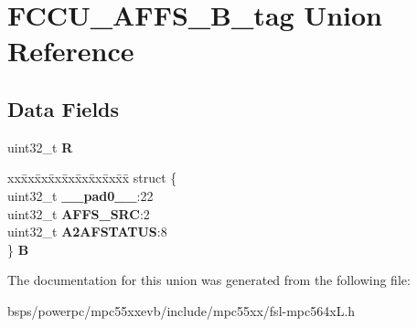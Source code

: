 \hypertarget{unionFCCU__AFFS__32B__tag}{}\section{F\+C\+C\+U\+\_\+\+A\+F\+F\+S\+\_\+B\+\_\+tag Union Reference}
\label{unionFCCU__AFFS__32B__tag}
\subsection*{Data Fields}
\begin{DoxyCompactItemize}
\item 
\mbox{\label{unionFCCU__AFFS__32B__tag_ac6870abcb7cd6692750a5fca0755a75c}} 
uint32\+\_\+t {\bfseries R}
\item 
\mbox{\label{unionFCCU__AFFS__32B__tag_af6837127660af7320d7a0312c13b4f09}} 
\begin{tabbing}
xx\=xx\=xx\=xx\=xx\=xx\=xx\=xx\=xx\=\kill
struct \{\\
\>uint32\_t {\bfseries \_\_pad0\_\_}:22\\
\>uint32\_t {\bfseries AFFS\_SRC}:2\\
\>uint32\_t {\bfseries A2AFSTATUS}:8\\
\} {\bfseries B}\\

\end{tabbing}\end{DoxyCompactItemize}


The documentation for this union was generated from the following file\+:\begin{DoxyCompactItemize}
\item 
bsps/powerpc/mpc55xxevb/include/mpc55xx/fsl-\/mpc564x\+L.\+h\end{DoxyCompactItemize}

